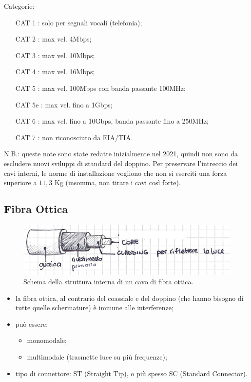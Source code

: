 \newpage
\noindent Categorie:
\begin{itemize}
    \item [CAT 1]: solo per segnali vocali (telefonia);
    \item [CAT 2]: max vel. 4Mbps;
    \item [CAT 3]: max vel. 10Mbps;
    \item [CAT 4]: max vel. 16Mbps;
    \item [CAT 5]: max vel. 100Mbps con banda passante 100MHz;
    \item [CAT 5e]: max vel. fino a 1Gbps;
    \item [CAT 6]: max vel. fino a 10Gbps, banda passante fino a 250MHz;
    \item [CAT 7]: non riconosciuto da EIA/TIA.
\end{itemize}
\noindent N.B.: queste note sono state redatte inizialmente nel 2021, quindi non sono da escludere nuovi sviluppi di standard del doppino. Per preservare l'intreccio dei cavi interni, le norme di installazione vogliono che non si eserciti una forza superiore a $11,3$ Kg (insomma, non tirare i cavi così forte).\\

\subsection*{Fibra Ottica}
\begin{figure} [ht]
    \centering
    \includegraphics[width=0.75\linewidth]{Figures//06/of.png}
    \caption{Schema della struttura interna di un cavo di fibra ottica.}
    \label{fig:06OF}
\end{figure}
\begin{itemize}
    \item la fibra ottica, al contrario del coassiale e del doppino (che hanno bisogno di tutte quelle schermature) è immune alle interferenze;
    \item può essere:
    \begin{itemize}
        \item monomodale;
        \item multimodale (trasmette luce su più frequenze);
    \end{itemize}
    \item  tipo di connettore: ST (Straight Tip), o più spesso SC (Standard Connector).
\end{itemize}

